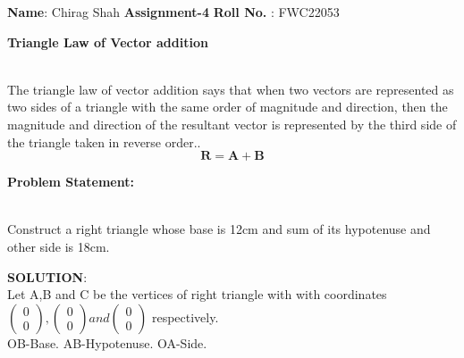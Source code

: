 \documentclass[10pt,a4paper]{report}
\let\vec\mathbf
\begin{document}
\raggedright \textbf{Name}:\hspace{1mm} Chirag Shah\hspace{3cm} \Large \textbf{Assignment-4}\hspace{2.5cm} %
\normalsize \textbf{Roll No.} :\hspace{1mm} FWC22053\vspace{1cm}
\begin{multicols}{2}

\textbf{Triangle Law of Vector addition }
\vspace{0.5cm}\raggedright \\
The triangle law of vector addition says that when two vectors are represented as two sides of a triangle with the same order of magnitude and direction, then the magnitude and direction of the resultant vector is represented by the third side of the triangle taken in reverse order..\vspace{3mm} \\ 
\begin{equation}
\vec{R}=\vec{A}+\vec{B} 
\end{equation}
\raggedright \textbf{Problem Statement:}\vspace{2mm}
\raggedright \\Construct a right triangle whose base is 12cm and sum of its hypotenuse and other side is 18cm.\\
\vspace{5mm}
\raggedright \textbf{SOLUTION}:\vspace{2mm}\\
Let A,B and C be the vertices of right triangle with with coordinates $\begin{pmatrix}
0 \\
0 
\end{pmatrix} 
, \begin{pmatrix}
0 \\
0 
\end{pmatrix} 
 and \begin{pmatrix}
0 \\
0 
\end{pmatrix} $
\vspace{1mm} respectively.\vspace{2mm}\\
OB-Base.
AB-Hypotenuse.
OA-Side.\\\vspace{2mm}

\end{multicols}
\end{document}

